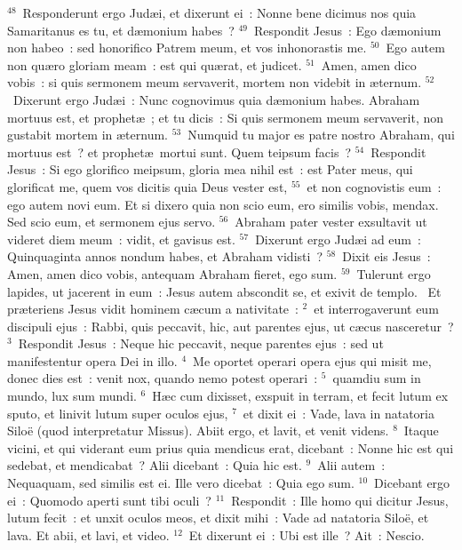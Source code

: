 ${}^{48}$~Responderunt ergo Jud\ae i, et dixerunt ei~: Nonne bene dicimus nos quia Samaritanus es tu, et d\ae monium habes~?
${}^{49}$~Respondit Jesus~: Ego d\ae monium non habeo~: sed honorifico Patrem meum, et vos inhonorastis me.
${}^{50}$~Ego autem non qu\ae ro gloriam meam~: est qui qu\ae rat, et judicet.
${}^{51}$~Amen, amen dico vobis~: si quis sermonem meum servaverit, mortem non videbit in \ae ternum.
${}^{52}$~Dixerunt ergo Jud\ae i~: Nunc cognovimus quia d\ae monium habes. Abraham mortuus est, et prophet\ae~; et tu dicis~: Si quis sermonem meum servaverit, non gustabit mortem in \ae ternum.
${}^{53}$~Numquid tu major es patre nostro Abraham, qui mortuus est~? et prophet\ae\ mortui sunt. Quem teipsum facis~?
${}^{54}$~Respondit Jesus~: Si ego glorifico meipsum, gloria mea nihil est~: est Pater meus, qui glorificat me, quem vos dicitis quia Deus vester est,
${}^{55}$~et non cognovistis eum~: ego autem novi eum. Et si dixero quia non scio eum, ero similis vobis, mendax. Sed scio eum, et sermonem ejus servo.
${}^{56}$~Abraham pater vester exsultavit ut videret diem meum~: vidit, et gavisus est.
${}^{57}$~Dixerunt ergo Jud\ae i ad eum~: Quinquaginta annos nondum habes, et Abraham vidisti~?
${}^{58}$~Dixit eis Jesus~: Amen, amen dico vobis, antequam Abraham fieret, ego sum.
${}^{59}$~Tulerunt ergo lapides, ut jacerent in eum~: Jesus autem abscondit se, et exivit de templo.
~\lettrine[lines=10,image=true,loversize=0.05,lraise=-0.03]{E}{}t pr\ae teriens Jesus vidit hominem c\ae cum a nativitate~:
${}^{2}$~et interrogaverunt eum discipuli ejus~: Rabbi, quis peccavit, hic, aut parentes ejus, ut c\ae cus nasceretur~?
${}^{3}$~Respondit Jesus~: Neque hic peccavit, neque parentes ejus~: sed ut manifestentur opera Dei in illo.
${}^{4}$~Me oportet operari opera ejus qui misit me, donec dies est~: venit nox, quando nemo potest operari~:
${}^{5}$~quamdiu sum in mundo, lux sum mundi.
${}^{6}$~H\ae c cum dixisset, exspuit in terram, et fecit lutum ex sputo, et linivit lutum super oculos ejus,
${}^{7}$~et dixit ei~: Vade, lava in natatoria Silo\"e (quod interpretatur Missus). Abiit ergo, et lavit, et venit videns.
${}^{8}$~Itaque vicini, et qui viderant eum prius quia mendicus erat, dicebant~: Nonne hic est qui sedebat, et mendicabat~? Alii dicebant~: Quia hic est.
${}^{9}$~Alii autem~: Nequaquam, sed similis est ei. Ille vero dicebat~: Quia ego sum.
${}^{10}$~Dicebant ergo ei~: Quomodo aperti sunt tibi oculi~?
${}^{11}$~Respondit~: Ille homo qui dicitur Jesus, lutum fecit~: et unxit oculos meos, et dixit mihi~: Vade ad natatoria Silo\"e, et lava. Et abii, et lavi, et video.
${}^{12}$~Et dixerunt ei~: Ubi est ille~? Ait~: Nescio.


